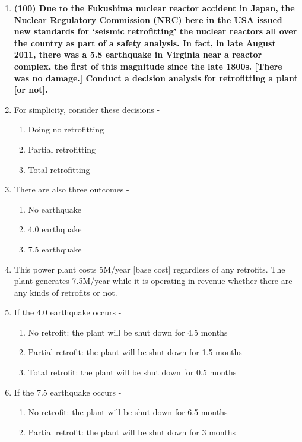 \documentclass[11pt,a4paper]{article}
\begin{document}
\begin{enumerate}[leftmargin=*,topsep=0pt,font=\bfseries]
        \newpage
    \item\textbf{(100) Due to the Fukushima nuclear reactor accident in Japan, the Nuclear Regulatory Commission (NRC) here in the USA issued new standards for ‘seismic retrofitting’ the nuclear reactors all over the country as part of a safety analysis. In fact, in late August 2011, there was a 5.8 earthquake in Virginia near a reactor complex, the first of this magnitude since the late 1800s. [There was no damage.] Conduct a decision analysis for retrofitting a plant [or not].}
    \item[] For simplicity, consider these decisions - 
        \begin{enumerate}
            \item Doing no retrofitting
            \item Partial retrofitting 
            \item Total retrofitting
        \end{enumerate}
    \item[] There are also three outcomes - 
        \begin{enumerate}[label=(\alph*)]
            \item No earthquake
            \item 4.0 earthquake
            \item 7.5 earthquake
        \end{enumerate}
    \item[] This power plant costs 5M/year [base cost] regardless of any retrofits. The plant generates 7.5M/year while it is operating in revenue whether there are any kinds of retrofits or not.
    \item[] If the 4.0 earthquake occurs - 
        \begin{enumerate}
            \item No retrofit: the plant will be shut down for 4.5 months
            \item Partial retrofit: the plant will be shut down for 1.5 months
            \item Total retrofit: the plant will be shut down for 0.5 months
        \end{enumerate}
    \item[] If the 7.5 earthquake occurs - 
        \begin{enumerate}
            \item No retrofit: the plant will be shut down for 6.5 months
            \item Partial retrofit: the plant will be shut down for 3 months

\end{enumerate}
\end{enumerate}
\end{document}

